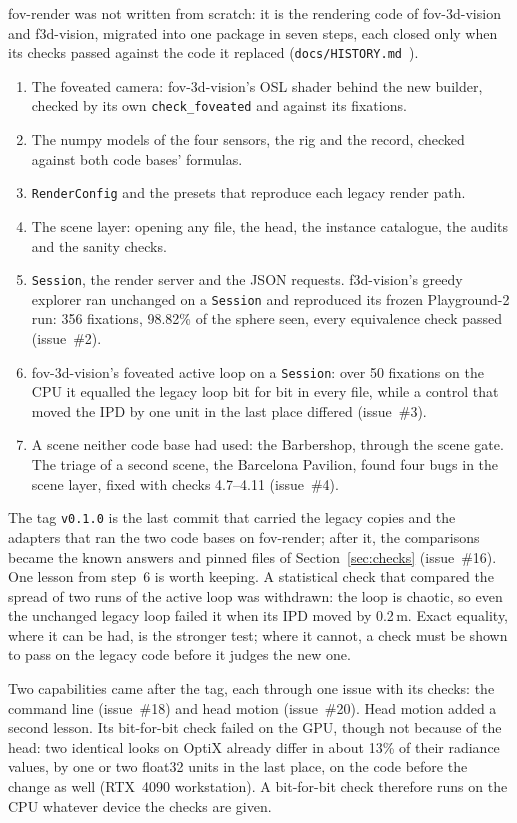 \documentclass[11pt,a4paper]{article}
\newcommand{\code}[1]{\texttt{\small #1}}
\begin{document}
fov-render was not written from scratch: it is the rendering code of fov-3d-vision and f3d-vision, migrated into
one package in seven steps, each closed only when its checks passed against the code it replaced
(\code{docs/HISTORY.md}~\cite{fovrenderHist}).
\begin{enumerate}
\item The foveated camera: fov-3d-vision's OSL shader behind the new builder, checked by its own
  \code{check\_foveated} and against its fixations.
\item The numpy models of the four sensors, the rig and the record, checked against both code bases' formulas.
\item \code{RenderConfig} and the presets that reproduce each legacy render path.
\item The scene layer: opening any file, the head, the instance catalogue, the audits and the sanity checks.
\item \code{Session}, the render server and the JSON requests. f3d-vision's greedy explorer ran unchanged on a
  \code{Session} and reproduced its frozen Playground-2 run: 356 fixations, 98.82\% of the sphere seen, every
  equivalence check passed (issue~\#2).
\item fov-3d-vision's foveated active loop on a \code{Session}: over 50 fixations on the CPU it equalled the
  legacy loop bit for bit in every file, while a control that moved the IPD by one unit in the last place
  differed (issue~\#3).
\item A scene neither code base had used: the Barbershop, through the scene gate. The triage of a second scene,
  the Barcelona Pavilion, found four bugs in the scene layer, fixed with checks 4.7--4.11 (issue~\#4).
\end{enumerate}
The tag \code{v0.1.0} is the last commit that carried the legacy copies and the adapters that ran the two code
bases on fov-render; after it, the comparisons became the known answers and pinned files of
Section~\ref{sec:checks} (issue~\#16). One lesson from step~6 is worth keeping. A statistical check that
compared the spread of two runs of the active loop was withdrawn: the loop is chaotic, so even the unchanged
legacy loop failed it when its IPD moved by 0.2\,\textmu m. Exact equality, where it can be had, is the stronger
test; where it cannot, a check must be shown to pass on the legacy code before it judges the new one.

Two capabilities came after the tag, each through one issue with its checks: the command line (issue~\#18) and
head motion (issue~\#20). Head motion added a second lesson. Its bit-for-bit check failed on the GPU, though not
because of the head: two identical looks on OptiX already differ in about 13\% of their radiance values, by one
or two float32 units in the last place, on the code before the change as well (RTX~4090 workstation). A
bit-for-bit check therefore runs on the CPU whatever device the checks are given.
\end{document}
